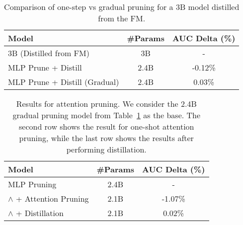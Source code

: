 \begin{table}[t]
\centering
\begin{tabular}{lcc}
\hline\hline
\textbf{Model} & \textbf{\#Params} & \textbf{AUC Delta (\%)} \\
\hline\hline
3B (Distilled from FM)         & 3B &  -\\
MLP Prune + Distill    & 2.4B &  -0.12\%\\
MLP Prune + Distill (Gradual)   & 2.4B & 0.03\% \\

\hline\hline
\end{tabular}
\caption{Comparison of one-step vs gradual pruning for a 3B model distilled from the FM.}
\label{tab:gradual_pruning}
\end{table}


\begin{table}[t]
\centering
\begin{tabular}{lcc}
\hline\hline
\textbf{Model} & \textbf{\#Params} & \textbf{AUC Delta (\%)} \\
\hline\hline
MLP Pruning       & 2.4B &  -\\
$\wedge$ + Attention Pruning    & 2.1B &  -1.07\%\\
$\wedge$ + Distillation  & 2.1B & 0.02\% \\

\hline\hline
\end{tabular}
\caption{Results for attention pruning. We consider the 2.4B gradual pruning model from Table~\ref{tab:gradual_pruning} as the base. The second row shows the result for one-shot attention pruning, while the last row shows the results after performing distillation.}
\label{tab:mlp_vs_attn_pruning}
\end{table}


